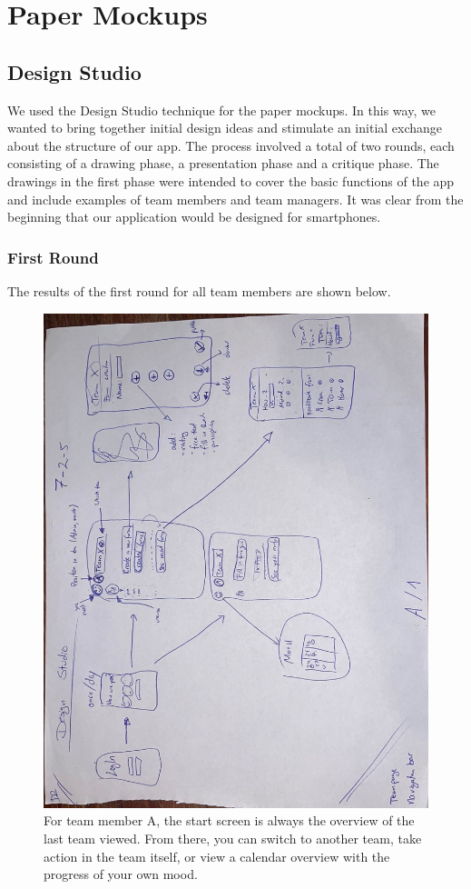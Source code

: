 \documentclass[11pt]{article}
\begin{document}
\newpage

\section{Paper Mockups}

\subsection{Design Studio}
We used the Design Studio technique for the paper mockups. In this way, we wanted to bring together initial design ideas and stimulate an initial exchange about the structure of our app. The process involved a total of two rounds, each consisting of a drawing phase, a presentation phase and a critique phase. The drawings in the first phase were intended to cover the basic functions of the app and include examples of team members and team managers. It was clear from the beginning that our application would be designed for smartphones.
\subsubsection{First Round}
The results of the first round for all team members are shown below.
\begin{figure}[!h]
    \centering
    \includegraphics[scale = 0.3]{figures/A1.jpg}
    \caption{For team member A, the start screen is always the overview of the last team viewed. From there, you can switch to another team, take action in the team itself, or view a calendar overview with the progress of your own mood.}
\end{figure}
\end{document}
